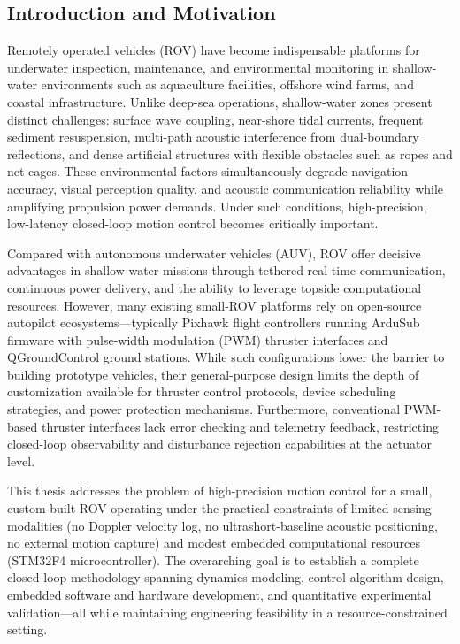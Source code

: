 
\begin{digest}

\section{Introduction and Motivation}

Remotely operated vehicles (ROV) have become indispensable platforms for underwater inspection, maintenance, and environmental monitoring in shallow-water environments such as aquaculture facilities, offshore wind farms, and coastal infrastructure. Unlike deep-sea operations, shallow-water zones present distinct challenges: surface wave coupling, near-shore tidal currents, frequent sediment resuspension, multi-path acoustic interference from dual-boundary reflections, and dense artificial structures with flexible obstacles such as ropes and net cages. These environmental factors simultaneously degrade navigation accuracy, visual perception quality, and acoustic communication reliability while amplifying propulsion power demands. Under such conditions, high-precision, low-latency closed-loop motion control becomes critically important.

Compared with autonomous underwater vehicles (AUV), ROV offer decisive advantages in shallow-water missions through tethered real-time communication, continuous power delivery, and the ability to leverage topside computational resources. However, many existing small-ROV platforms rely on open-source autopilot ecosystems---typically Pixhawk flight controllers running ArduSub firmware with pulse-width modulation (PWM) thruster interfaces and QGroundControl ground stations. While such configurations lower the barrier to building prototype vehicles, their general-purpose design limits the depth of customization available for thruster control protocols, device scheduling strategies, and power protection mechanisms. Furthermore, conventional PWM-based thruster interfaces lack error checking and telemetry feedback, restricting closed-loop observability and disturbance rejection capabilities at the actuator level.

This thesis addresses the problem of high-precision motion control for a small, custom-built ROV operating under the practical constraints of limited sensing modalities (no Doppler velocity log, no ultrashort-baseline acoustic positioning, no external motion capture) and modest embedded computational resources (STM32F4 microcontroller). The overarching goal is to establish a complete closed-loop methodology spanning dynamics modeling, control algorithm design, embedded software and hardware development, and quantitative experimental validation---all while maintaining engineering feasibility in a resource-constrained setting.


\end{digest}
